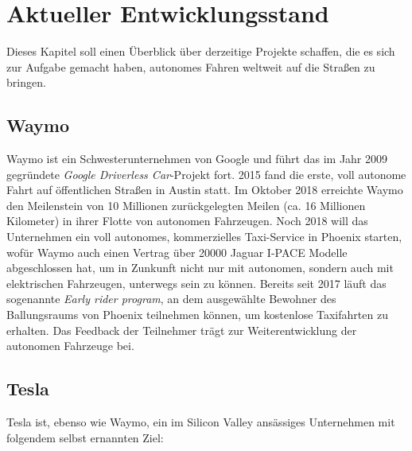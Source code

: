 \chapter{Aktueller Entwicklungsstand}

Dieses Kapitel soll einen Überblick über derzeitige Projekte schaffen, die es sich zur Aufgabe gemacht haben, autonomes Fahren weltweit auf die Straßen zu bringen.

\section{Waymo}

Waymo ist ein Schwesterunternehmen von Google und führt das im Jahr 2009 gegründete \textit{Google Driverless Car}-Projekt fort. 2015 fand die erste, voll autonome Fahrt auf öffentlichen Straßen in Austin statt. Im Oktober 2018 erreichte Waymo den Meilenstein von 10 Millionen zurückgelegten Meilen (ca. 16 Millionen Kilometer) in ihrer Flotte von autonomen Fahrzeugen. Noch 2018 will das Unternehmen ein voll autonomes, kommerzielles Taxi-Service in Phoenix starten, wofür Waymo auch einen Vertrag über \num{20000} Jaguar I-PACE Modelle abgeschlossen hat, um in Zunkunft nicht nur mit autonomen, sondern auch mit elektrischen Fahrzeugen, unterwegs sein zu können.  Bereits seit 2017 läuft das sogenannte \textit{Early rider program}, an dem ausgewählte Bewohner des Ballungsraums von Phoenix teilnehmen können, um kostenlose Taxifahrten zu erhalten. Das Feedback der Teilnehmer trägt zur Weiterentwicklung der autonomen Fahrzeuge bei.


\section{Tesla}

Tesla ist, ebenso wie Waymo, ein im Silicon Valley ansässiges Unternehmen mit folgendem selbst ernannten Ziel:  
